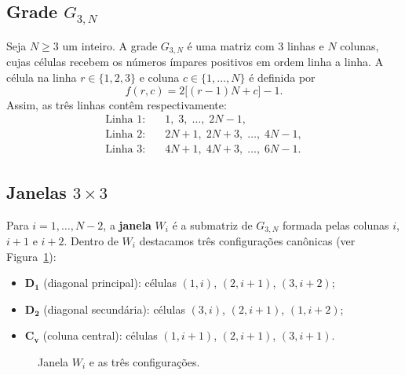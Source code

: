 \documentclass[12pt, a4paper]{article}
\begin{document}
	\subsection{Grade $G_{3,N}$}
	Seja $N\ge 3$ um inteiro. A grade $G_{3,N}$ é uma matriz com $3$ linhas e $N$ colunas, cujas células recebem os números ímpares positivos em ordem linha a linha. A célula na linha $r\in\{1,2,3\}$ e coluna $c\in\{1,\dots,N\}$ é definida por
	\[
	f(r,c)=2\bigl[(r-1)N + c\bigr] - 1.
	\]
	Assim, as três linhas contêm respectivamente:
	\begin{align*}
		\text{Linha 1:}&\quad 1,\;3,\;\dots,\;2N-1,\\
		\text{Linha 2:}&\quad 2N+1,\;2N+3,\;\dots,\;4N-1,\\
		\text{Linha 3:}&\quad 4N+1,\;4N+3,\;\dots,\;6N-1.
	\end{align*}
	
	\subsection{Janelas $3\times 3$}
	Para $i=1,\dots,N-2$, a \textbf{janela} $W_i$ é a submatriz de $G_{3,N}$ formada pelas colunas $i$, $i+1$ e $i+2$. Dentro de $W_i$ destacamos três configurações canônicas (ver Figura~\ref{fig:janela}):
	\begin{itemize}
		\item $\mathbf{D_1}$ (diagonal principal): células $(1,i)$, $(2,i+1)$, $(3,i+2)$;
		\item $\mathbf{D_2}$ (diagonal secundária): células $(3,i)$, $(2,i+1)$, $(1,i+2)$;
		\item $\mathbf{C_v}$ (coluna central): células $(1,i+1)$, $(2,i+1)$, $(3,i+1)$.
	\end{itemize}
	
	\begin{figure}[h]
		\centering
		\caption{Janela $W_i$ e as três configurações.}
		\label{fig:janela}
	\end{figure}
	
\end{document}
